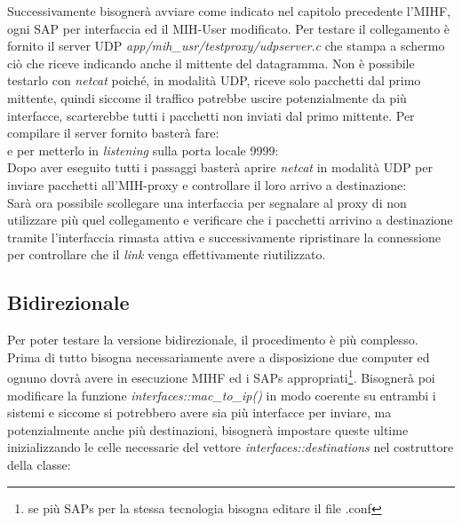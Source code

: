 Successivamente bisognerà avviare come indicato nel capitolo precedente l'MIHF, ogni SAP per interfaccia ed il MIH-User modificato. Per testare il collegamento è fornito il server UDP {\em app/mih\_usr/testproxy/udpserver.c} che stampa a schermo ciò che riceve indicando anche il mittente del datagramma. Non è possibile testarlo con {\em netcat}\cite{netcat} poiché, in modalità UDP, riceve solo pacchetti dal primo mittente, quindi siccome il traffico potrebbe uscire potenzialmente da più interfacce, scarterebbe tutti i pacchetti non inviati dal primo mittente. Per compilare il server fornito basterà fare:\\
e per metterlo in {\em listening} sulla porta locale 9999:\\
Dopo aver eseguito tutti i passaggi basterà aprire {\em netcat} in modalità UDP per inviare pacchetti all'MIH-proxy e controllare il loro arrivo a destinazione:\\
Sarà ora possibile scollegare una interfaccia per segnalare al proxy di non utilizzare più quel collegamento e verificare che i pacchetti arrivino a destinazione tramite l'interfaccia rimasta attiva e successivamente ripristinare la connessione per controllare che il {\em link} venga effettivamente riutilizzato.

\subsection{Bidirezionale}

Per poter testare la versione bidirezionale, il procedimento è più complesso. Prima di tutto bisogna necessariamente avere a disposizione due computer ed ognuno dovrà avere in esecuzione MIHF ed i SAPs appropriati\footnote{se più SAPs per la stessa tecnologia bisogna editare il file .conf}. Bisognerà poi modificare la funzione {\em interfaces::mac\_to\_ip()} in modo coerente su entrambi i sistemi e siccome si potrebbero avere sia più interfacce per inviare, ma potenzialmente anche più destinazioni, bisognerà impostare queste ultime inizializzando le celle necessarie del vettore {\em interfaces::destinations} nel costruttore della classe:

